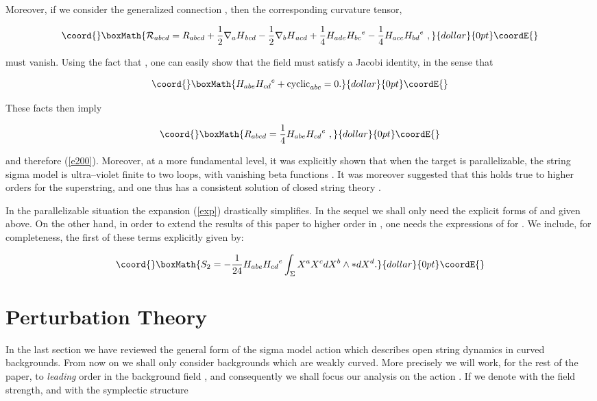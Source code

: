 \documentclass[a4paper,11pt]{article}
\begin{document}
\noindent
Moreover, if we consider the generalized connection \coordHE{},
then the corresponding curvature tensor,

$$\coord{}\boxMath{
\mathcal{R}_{abcd}=R_{abcd}+\frac{1}{2}\nabla_{a}H{}_{bcd}-\frac{1}{2}
\nabla_{b}H{}_{acd}+\frac{1}{4}H_{ade}{H_{bc}}^{e}-\frac{1}{4} 
H_{ace}{H_{bd}}^{e}\ ,
}{dollar}{0pt}\coordE{}$$

\noindent
must vanish. Using the fact that \coordHE{}, one can easily show that
the field \coordHE{} must satisfy a Jacobi identity, in the sense that 

$$\coord{}\boxMath{
H_{abe}{H_{cd}}^{e}+\mathrm{cyclic}_{abc}=0.
}{dollar}{0pt}\coordE{}$$

\noindent
These facts then imply 

$$\coord{}\boxMath{
R_{abcd}=\frac{1}{4}H_{abe}{H_{cd}}^{e}\ ,
}{dollar}{0pt}\coordE{}$$

\noindent
and therefore (\ref{e200}). Moreover, at a more fundamental level, it was
explicitly shown that when the target is parallelizable, the string sigma
model is ultra--violet finite to two loops, with vanishing beta 
functions \cite{BCZ}. It was moreover suggested that this holds true to 
higher orders for the superstring, and one thus has a consistent solution of 
closed string theory \cite{BCZ}.

In the parallelizable situation the expansion (\ref{exp}) drastically
simplifies. In the sequel we shall only need the explicit forms of \coordHE{}
and \coordHE{} given above. On the other hand, in order to extend the results of 
this paper to higher order in \coordHE{}, one needs the expressions of \coordHE{} for 
\coordHE{}. We include, for completeness, the first of these terms explicitly
given by:

$$\coord{}\boxMath{
S_{2}=-\frac{1}{24}H_{abe}{H_{cd}}^{e}\int_{\Sigma }X^{a}X^{c}dX^{b} 
\wedge \ast dX^{d}.
}{dollar}{0pt}\coordE{}$$


\section{Perturbation Theory}


In the last section we have reviewed the general form of the sigma model
action which describes open string dynamics in curved backgrounds. From now
on we shall only consider backgrounds which are weakly curved. More
precisely we will work, for the rest of the paper, to \textit{leading} order
in the background field \coordHE{}, and consequently we shall focus our 
analysis on the action \coordHE{}. If we denote with \coordHE{} the 
\coordHE{} field strength, and with \myHighlight{$\omega$}\coordHE{} the symplectic 
structure
\end{document}
